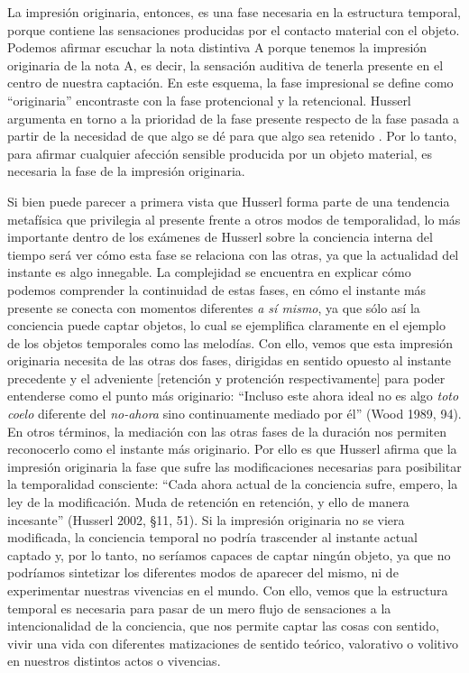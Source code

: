La impresión originaria, entonces, es una fase necesaria en la
estructura temporal, porque contiene las sensaciones producidas por el
contacto material con el objeto. Podemos afirmar escuchar la nota
distintiva A porque tenemos la impresión originaria de la nota A, es
decir, la sensación auditiva de tenerla presente en el centro de nuestra
captación. En este esquema, la fase impresional se define como
``originaria'' encontraste con la fase protencional y la retencional.
Husserl argumenta en torno a la prioridad de la fase presente respecto
de la fase pasada a partir de la necesidad de que algo se dé para que
algo sea retenido \cite[p.~25]{kretschel2014}. Por lo tanto, para afirmar
cualquier afección sensible producida por un objeto material, es
necesaria la fase de la impresión originaria.

Si bien puede parecer a primera vista que Husserl forma parte de una
tendencia metafísica que privilegia al presente frente a otros modos de
temporalidad, lo más importante dentro de los exámenes de Husserl sobre
la conciencia interna del tiempo será ver cómo esta fase se relaciona
con las otras, ya que la actualidad del instante es algo innegable. La
complejidad se encuentra en explicar cómo podemos comprender la
continuidad de estas fases, en cómo el instante más presente se conecta
con momentos diferentes \emph{a sí mismo}, ya que sólo así la conciencia
puede captar objetos, lo cual se ejemplifica claramente en el ejemplo de
los objetos temporales como las melodías. Con ello, vemos que esta
impresión originaria necesita de las otras dos fases, dirigidas en
sentido opuesto al instante precedente y el adveniente {[}retención y
protención respectivamente{]} para poder entenderse como el punto más
originario: ``Incluso este ahora ideal no es algo \textit{toto coelo}
diferente del \emph{no-ahora} sino continuamente mediado por él'' (Wood
1989, 94). En otros términos, la mediación con las otras fases de la
duración nos permiten reconocerlo como el instante más originario. Por
ello es que Husserl afirma que la impresión originaria la fase que sufre
las modificaciones necesarias para posibilitar la temporalidad
consciente: ``Cada ahora actual de la conciencia sufre, empero, la ley
de la modificación. Muda de retención en retención, y ello de manera
incesante'' (Husserl 2002, §11, 51). Si la impresión originaria
no se viera modificada, la conciencia temporal no podría trascender al
instante actual captado y, por lo tanto, no seríamos capaces de captar
ningún objeto, ya que no podríamos sintetizar los diferentes modos de
aparecer del mismo, ni de experimentar nuestras vivencias en el mundo.
Con ello, vemos que la estructura temporal es necesaria para pasar de un
mero flujo de sensaciones a la intencionalidad de la conciencia, que nos
permite captar las cosas con sentido, vivir una vida con diferentes
matizaciones de sentido teórico, valorativo o volitivo en nuestros
distintos actos o vivencias.

